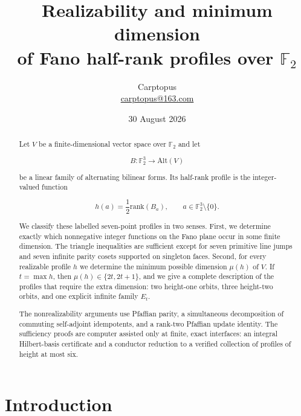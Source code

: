\documentclass[11pt]{article}
\title{Realizability and minimum dimension\\
of Fano half-rank profiles over \texorpdfstring{$\mathbb F_2$}{F2}}
\author{Carptopus\\\href{mailto:carptopus@163.com}{carptopus@163.com}}
\date{30 August 2026}
\theoremstyle{remark}
\numberwithin{equation}{section}
\begin{document}
\maketitle

\begin{center}
\end{center}

\begin{abstract}


Let $V$ be a finite-dimensional vector space over $\mathbb F_2$ and let

\nopagebreak[4]
\[
B:\mathbb F_2^3\longrightarrow \mathrm{Alt}(V)
\]

be a linear family of alternating bilinear forms. Its half-rank profile is the
integer-valued function

\nopagebreak[4]
\[
h(a)=\frac{1}{2}\mathrm{rank}(B_a),
\qquad a\in\mathbb F_2^3\setminus\{0\}.
\]

We classify these labelled seven-point profiles in two senses. First, we
determine exactly which nonnegative integer functions on the Fano plane occur in
some finite dimension. The triangle inequalities are sufficient except for
seven primitive line jumps and seven infinite parity cosets supported on
singleton faces. Second, for every realizable profile $h$ we determine the
minimum possible dimension $\mu(h)$ of $V$. If $t=\max h$, then
$\mu(h)\in\{2t,2t+1\}$, and we give a complete description of the profiles that
require the extra dimension: two height-one orbits, three height-two orbits,
and one explicit infinite family $E_t$.

The nonrealizability arguments use Pfaffian parity, a simultaneous decomposition
of commuting self-adjoint idempotents, and a rank-two Pfaffian update identity.
The sufficiency proofs are computer assisted only at finite, exact interfaces:
an integral Hilbert-basis certificate and a conductor reduction to a verified
collection of profiles of height at most six.

\end{abstract}

\section{Introduction}
\end{document}
